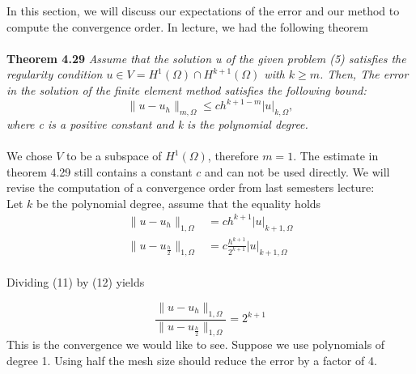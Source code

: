 \documentclass[a4paper,12pt]{article}
\begin{document}
In this section, we will discuss our expectations of the error and our method to compute the convergence order. In lecture, we had the following theorem\\
\\
\textbf{Theorem 4.29} \textit{Assume that the solution u of the given problem (5) satisfies
the regularity condition $u \in V=H^1(\Omega) \cap H^{k+1}(\Omega)$ with $k \geq m$. Then, The error in the solution of the finite element method satisfies the following bound:}
\[\|u-u_h\|_{m,\Omega}\leq ch^{k+1-m}|u|_{k,\Omega},\]
\textit{where c is a positive constant and k is the polynomial degree.}\\
\\
We chose $V$ to be a subspace of $H^1(\Omega)$, therefore $m=1$. The estimate in theorem 4.29 still contains a constant $c$ and can not be used directly. We will revise the computation of a convergence order from last semesters lecture:\\
Let $k$ be the polynomial degree, assume that the equality holds
\begin{align}
\|u-u_h\|_{1,\Omega}&= ch^{k+1}|u|_{k+1,\Omega} \\
\|u-u_{\frac{h}{2}}\|_{1,\Omega}&= c\frac{h^{k+1}}{2^{k+1}}|u|_{{k+1},\Omega}
\end{align}
\\
Dividing (11) by (12) yields 

\[\frac{\|u-u_h\|_{1,\Omega}}{\|u-u_{\frac{h}{2}}\|_{1,\Omega}}= 2^{k+1}\]
This is the convergence we would like to see. Suppose we use polynomials of degree 1. Using half the mesh size should reduce the error by a factor of 4.
\end{document}
